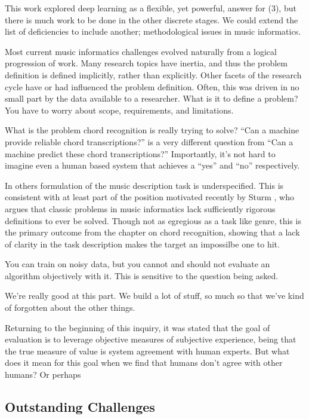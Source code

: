 This work explored deep learning as a flexible, yet powerful, answer for (3), but there is much work to be done in the other discrete stages.
We could extend the list of deficiencies to include another; methodological issues in music informatics.

Most current music informatics challenges evolved naturally from a logical progression of work.
Many research topics have inertia, and thus the problem definition is defined implicitly, rather than explicitly.
Other facets of the research cycle have or had influenced the problem definition.
Often, this was driven in no small part by the data available to a researcher.
What is it to define a problem?
You have to worry about scope, requirements, and limitations.

What is the problem chord recognition is really trying to solve?
``Can a machine provide reliable chord transcriptions?'' is a very different question from ``Can a machine predict these chord transcriptions?''
Importantly, it's not hard to imagine even a human based system that achieves a ``yes'' and ``no'' respectively.

In others formulation of the music description task is underspecified.
This is consistent with at least part of the position motivated recently by Sturm \cite{}, who argues that classic problems in music informatics lack sufficiently rigorous definitions to ever be solved.
Though not as egregious as a task like genre, this is the primary outcome from the chapter on chord recognition, showing that a lack of clarity in the task description makes the target an impossilbe one to hit.

You can train on noisy data, but you cannot and should not evaluate an algorithm objectively with it.
This is sensitive to the question being asked.

We're really good at this part.
We build a lot of stuff, so much so that we've kind of forgotten about the other things.


Returning to the beginning of this inquiry, it was stated that the goal of evaluation is to leverage objective measures of subjective experience, being that the true measure of value is system agreement with human experts.
But what does it mean for this goal when we find that humans don't agree with other humans?
Or perhaps


\subsection{Outstanding Challenges}

